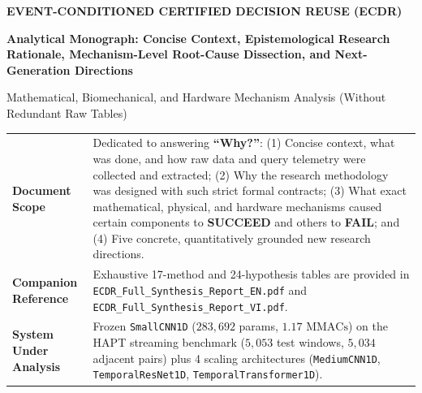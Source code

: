 \documentclass[11pt,a4paper]{article}
\newcommand{\code}[1]{{\small\ttfamily\nolinkurl{#1}}}
\begin{document}
\hypersetup{pageanchor=false}
\begin{titlepage}
\vspace*{0.4cm}
{\Large\bfseries\color{teal} EVENT-CONDITIONED CERTIFIED DECISION REUSE (ECDR)\par}
\vspace{0.35cm}
{\huge\bfseries\color{ink} Analytical Monograph: Concise Context, Epistemological Research Rationale, Mechanism-Level Root-Cause Dissection, and Next-Generation Directions\par}
\vspace{0.45cm}
{\large\color{ink} Mathematical, Biomechanical, and Hardware Mechanism Analysis (Without Redundant Raw Tables)\par}
\vspace{0.55cm}

\begin{tabularx}{\linewidth}{@{}P{4.0cm}Y@{}}
\toprule
\textbf{Document Scope} & Dedicated to answering \textbf{``Why?''}: (1) Concise context, what was done, and how raw data and query telemetry were collected and extracted; (2) Why the research methodology was designed with such strict formal contracts; (3) What exact mathematical, physical, and hardware mechanisms caused certain components to \textbf{SUCCEED} and others to \textbf{FAIL}; and (4) Five concrete, quantitatively grounded new research directions.\\
\textbf{Companion Reference} & Exhaustive 17-method and 24-hypothesis tables are provided in \code{ECDR\_Full\_Synthesis\_Report\_EN.pdf} and \code{ECDR\_Full\_Synthesis\_Report\_VI.pdf}.\\
\textbf{System Under Analysis} & Frozen \code{SmallCNN1D} ($283,692$ params, $1.17\text{ MMACs}$) on the HAPT streaming benchmark ($5,053$ test windows, $5,034$ adjacent pairs) plus 4 scaling architectures (\code{MediumCNN1D}, \code{TemporalResNet1D}, \code{TemporalTransformer1D}).\\
\bottomrule
\end{tabularx}


\end{titlepage}
\end{document}
